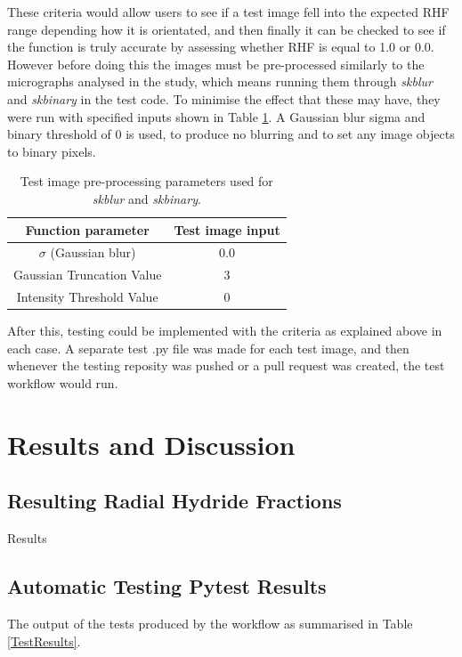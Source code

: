\documentclass{article}
\begin{document}
These criteria would allow users to see if a test image fell into the expected RHF range depending how it is orientated, and then finally it can be checked to see if the function is truly accurate by assessing whether RHF is equal to 1.0 or 0.0.  However before doing this the images must be pre-processed similarly to the micrographs analysed in the study, which means running them through \textit{skblur} and \textit{skbinary} in the test code. To minimise the effect that these may have, they were run with specified inputs shown in Table \ref{tab:TestImageTable}. A Gaussian blur sigma and binary threshold of 0 is used, to produce no blurring and to set any image objects to binary pixels.

\begin{table}[h]
    \centering
    \begin{tabular}{|c|c|}
    \hline
        \textbf{Function parameter} & \textbf{Test image input}  \\
        \hline
        $\sigma$ (Gaussian blur) & 0.0 \\
        \hline
        Gaussian Truncation Value & 3 \\
        \hline
        Intensity Threshold Value & 0 \\ 
    \hline
    \end{tabular}
    \caption{Test image pre-processing parameters used for \textit{skblur} and \textit{skbinary}.}
    \label{tab:TestImageTable}
\end{table}

After this, testing could be implemented with the criteria as explained above in each case. A separate test .py file was made for each test image, and then whenever the testing reposity was pushed or a pull request was created, the test workflow would run.

\section{Results and Discussion}
\subsection{Resulting Radial Hydride Fractions}
Results
\subsection{Automatic Testing Pytest Results}
The output of the tests produced by the workflow as summarised in Table \ref{TestResults}.
\end{document}
